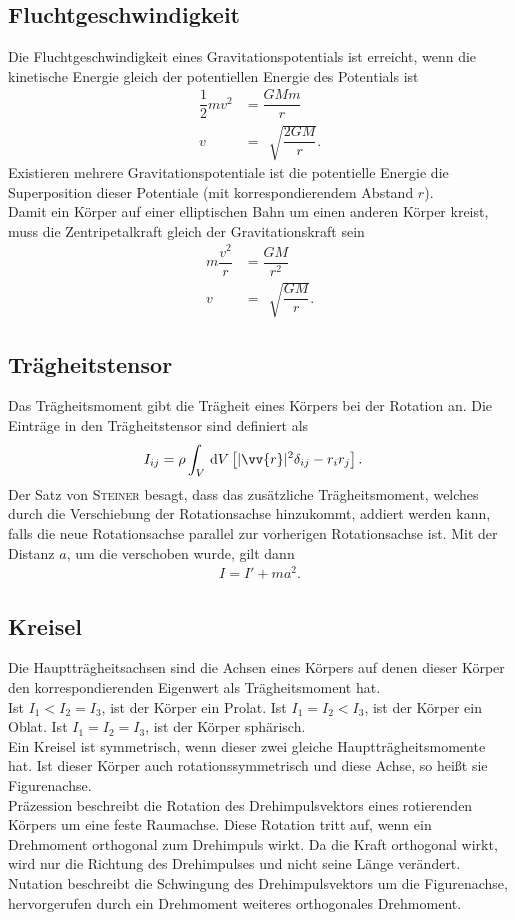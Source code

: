 \subsection{Fluchtgeschwindigkeit}
Die Fluchtgeschwindigkeit eines Gravitationspotentials ist erreicht, wenn die kinetische Energie gleich der potentiellen Energie des Potentials ist
\begin{align} 
        \dfrac{1}{2}mv^2&=\dfrac{GMm}{r}\\
        v&=\,\sqrt[]{\dfrac{2GM}{r}}
.\end{align} 
Existieren mehrere Gravitationspotentiale ist die potentielle Energie die Superposition dieser Potentiale (mit korrespondierendem Abstand $r$).\\\indent
Damit ein Körper auf einer elliptischen Bahn um einen anderen Körper kreist, muss die Zentripetalkraft gleich der Gravitationskraft sein
\begin{align} 
        m\dfrac{v^2}{r}&=\dfrac{GM}{r^2}\\
        v&=\,\sqrt[]{\dfrac{GM}{r}}
.\end{align} 

\subsection{Trägheitstensor}
Das Trägheitsmoment gibt die Trägheit eines Körpers bei der Rotation an.
Die Einträge in den Trägheitstensor sind definiert als
\begin{align} 
        I_{ij}&=\rho \int_{V}^{}\td V\left[|\vv{r}|^2\delta _{ij}-r_ir_j\right]
.\end{align} 
Der Satz von \textsc{Steiner} besagt, dass das zusätzliche Trägheitsmoment, welches durch die Verschiebung der Rotationsachse hinzukommt, addiert werden kann, falls die neue Rotationsachse parallel zur vorherigen Rotationsachse ist.
Mit der Distanz $a$, um die verschoben wurde, gilt dann
\begin{align} 
        I=I'+ma^2
.\end{align} 

\subsection{Kreisel}
Die Hauptträgheitsachsen sind die Achsen eines Körpers auf denen dieser Körper den korrespondierenden Eigenwert als Trägheitsmoment hat.\\\indent
Ist $I_1<I_2=I_3$, ist der Körper ein Prolat. 
Ist $I_1=I_2<I_3$, ist der Körper ein Oblat.
Ist $I_1=I_2=I_3$, ist der Körper sphärisch.\\\indent
Ein Kreisel ist symmetrisch, wenn dieser zwei gleiche Hauptträgheitsmomente hat.
Ist dieser Körper auch rotationssymmetrisch und diese Achse, so heißt sie Figurenachse.\\\indent
Präzession beschreibt die Rotation des Drehimpulsvektors eines rotierenden Körpers um eine feste Raumachse.
Diese Rotation tritt auf, wenn ein Drehmoment orthogonal zum Drehimpuls wirkt.
Da die Kraft orthogonal wirkt, wird nur die Richtung des Drehimpulses und nicht seine Länge verändert.\\\indent
Nutation beschreibt die Schwingung des Drehimpulsvektors um die Figurenachse, hervorgerufen durch ein Drehmoment weiteres orthogonales Drehmoment.
